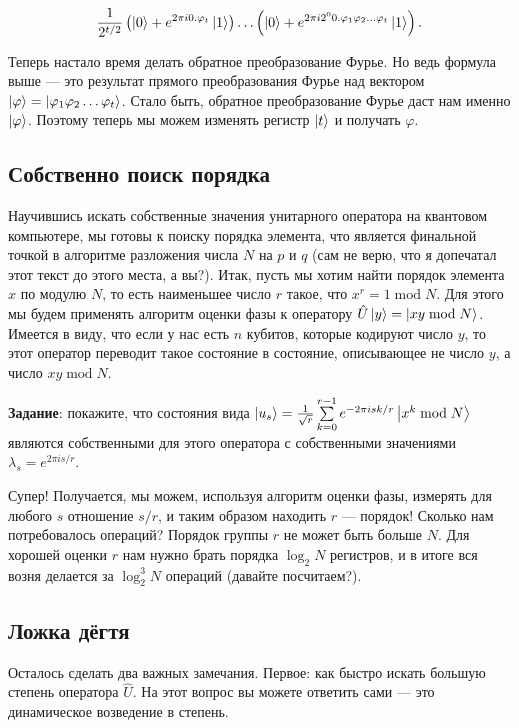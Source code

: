 \documentclass[12pt]{article}
\begin{document}
$$\frac{1}{2^{t / 2}}\left(\Ket{0} + e^{2 \pi i 0.\varphi_{t}}\Ket{1}\right)\ldots\left(\Ket{0} + e^{2 \pi i 2^{0}0.\varphi_1\varphi_2\ldots\varphi_t}\Ket{1}\right).$$

Теперь настало время делать обратное преобразование Фурье. Но ведь формула выше --- это результат прямого преобразования Фурье над вектором $\Ket{\varphi} = \Ket{\varphi_1\varphi_2\ldots\varphi_t}$. Стало быть, обратное преобразование Фурье даст нам именно $\Ket{\varphi}$. Поэтому теперь мы можем изменять регистр $\Ket{t}$ и получать $\varphi$.

\subsection*{Собственно поиск порядка}
Научившись искать собственные значения унитарного оператора на квантовом компьютере, мы готовы к поиску порядка элемента, что является финальной точкой в алгоритме разложения числа $N$ на $p$ и $q$ (сам не верю, что я допечатал этот текст до этого места, а вы?). Итак, пусть мы хотим найти порядок элемента $x$ по модулю $N$, то есть наименьшее число $r$ такое, что $x^r = 1\;\mbox{mod}\;N$. Для этого мы будем применять алгоритм оценки фазы к оператору $\hat{U}\Ket{y} = \Ket{xy\;\mbox{mod}\;N}$. Имеется в виду, что если у нас есть $n$ кубитов, которые кодируют число $y$, то этот оператор переводит такое состояние в состояние, описывающее не число $y$, а число $xy\;\mbox{mod}\;N$.

{\bf Задание}: покажите, что состояния вида $\Ket{u_s} = \frac{1}{\sqrt{r}}\sum\limits_{k = 0}^{r - 1} e^{-2 \pi i s k / r}\Ket{x^k\;\mbox{mod}\;N}$ являются собственными для этого оператора с собственными значениями $\lambda_s = e^{2 \pi i s / r}$.

Супер! Получается, мы можем, используя алгоритм оценки фазы, измерять для любого $s$ отношение $s/r$, и таким образом находить $r$ --- порядок! Сколько нам потребовалось операций? Порядок группы $r$ не может быть больше $N$. Для хорошей оценки $r$ нам нужно брать порядка $\log_2 N$ регистров, и в итоге вся возня делается за $\log_2^3 N$ операций (давайте посчитаем?).

\subsection*{Ложка дёгтя}
Осталось сделать два важных замечания. Первое: как быстро искать большую степень оператора $\hat{U}$. На этот вопрос вы можете ответить сами --- это динамическое возведение в степень.
\end{document}
